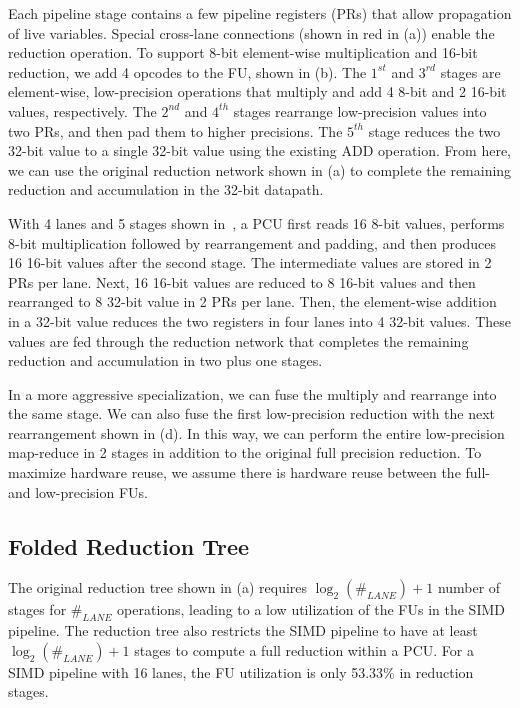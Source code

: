 Each pipeline stage contains a few pipeline registers (PRs)
  that allow propagation of live variables.
Special cross-lane connections (shown in red in  (a)) enable the reduction
operation.
To support 8-bit element-wise multiplication and 16-bit reduction, we add 4 opcodes to the FU, shown in
 (b).
The $1^{st}$ and $3^{rd}$ stages are element-wise, low-precision operations
  that multiply and add 4 8-bit and 2 16-bit values, respectively.
The $2^{nd}$ and $4^{th}$ stages rearrange low-precision values into two PRs,
  and then pad them to higher precisions.
The $5^{th}$ stage reduces the two 32-bit value to a single 32-bit value using the existing ADD operation. 
From here, we can use the original reduction network shown in  (a) to
complete the remaining reduction and accumulation in the 32-bit datapath.

With 4 lanes and 5 stages shown in~,
  a PCU first reads 16 8-bit values,
  performs 8-bit multiplication followed by rearrangement and padding,
  and then produces 16 16-bit values after the second stage.
The intermediate values are stored in 2 PRs per lane.
Next, 16 16-bit values are reduced to 8 16-bit values
  and then rearranged to 8 32-bit value in 2 PRs per lane.
Then, the element-wise addition in a 32-bit value
  reduces the two registers in four lanes into 4 32-bit values.
These values are fed through the
  reduction network that completes the remaining
  reduction and accumulation in two plus one stages.

In a more aggressive specialization,
  we can fuse the multiply and rearrange into the same stage.
We can also fuse the first low-precision reduction with the next rearrangement shown in  (d).
In this way, we can perform the entire low-precision map-reduce in 2 stages in addition to the original full precision reduction.
To maximize hardware reuse,
we assume there is hardware reuse between the full- and low-precision FUs.

\subsection{Folded Reduction Tree} \label{sec:foldrt}
The original reduction tree shown in  (a) requires $\log_2(\#_{LANE})+1$ number of
stages for $\#_{LANE}$ operations, leading to a low utilization of the FUs in the SIMD pipeline.
The reduction tree also restricts the SIMD pipeline to have at least 
$\log_2(\#_{LANE})+1$ stages to compute a full reduction within a PCU.
For a SIMD pipeline with 16 lanes, the FU utilization is only 53.33\% in reduction stages.

